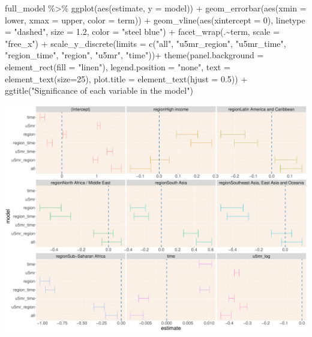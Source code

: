 \documentclass[
]{article}
\newenvironment{Shaded}{\begin{snugshade}}{\end{snugshade}}
\newcommand{\AttributeTok}[1]{\textcolor[rgb]{0.77,0.63,0.00}{#1}}
\newcommand{\DecValTok}[1]{\textcolor[rgb]{0.00,0.00,0.81}{#1}}
\newcommand{\FloatTok}[1]{\textcolor[rgb]{0.00,0.00,0.81}{#1}}
\newcommand{\FunctionTok}[1]{\textcolor[rgb]{0.00,0.00,0.00}{#1}}
\newcommand{\NormalTok}[1]{#1}
\newcommand{\SpecialCharTok}[1]{\textcolor[rgb]{0.00,0.00,0.00}{#1}}
\newcommand{\StringTok}[1]{\textcolor[rgb]{0.31,0.60,0.02}{#1}}
\begin{document}
\begin{Shaded}
\begin{Highlighting}[]
\NormalTok{full\_model }\SpecialCharTok{\%\textgreater{}\%} \FunctionTok{ggplot}\NormalTok{(}\FunctionTok{aes}\NormalTok{(estimate, }\AttributeTok{y =}\NormalTok{ model)) }\SpecialCharTok{+}
  \FunctionTok{geom\_errorbar}\NormalTok{(}\FunctionTok{aes}\NormalTok{(}\AttributeTok{xmin =}\NormalTok{ lower, }\AttributeTok{xmax =}\NormalTok{ upper, }\AttributeTok{color =}\NormalTok{ term)) }\SpecialCharTok{+}
  \FunctionTok{geom\_vline}\NormalTok{(}\FunctionTok{aes}\NormalTok{(}\AttributeTok{xintercept =} \DecValTok{0}\NormalTok{),}
             \AttributeTok{linetype =} \StringTok{"dashed"}\NormalTok{,}
             \AttributeTok{size =} \FloatTok{1.2}\NormalTok{,}
             \AttributeTok{color =} \StringTok{"steel blue"}\NormalTok{) }\SpecialCharTok{+}
  \FunctionTok{facet\_wrap}\NormalTok{(.}\SpecialCharTok{\textasciitilde{}}\NormalTok{term, }\AttributeTok{scale =} \StringTok{"free\_x"}\NormalTok{) }\SpecialCharTok{+}
  \FunctionTok{scale\_y\_discrete}\NormalTok{(}\AttributeTok{limits =} \FunctionTok{c}\NormalTok{(}\StringTok{"all"}\NormalTok{, }\StringTok{"u5mr\_region"}\NormalTok{, }\StringTok{"u5mr\_time"}\NormalTok{, }\StringTok{"region\_time"}\NormalTok{, }\StringTok{"region"}\NormalTok{, }\StringTok{"u5mr"}\NormalTok{, }\StringTok{"time"}\NormalTok{))}\SpecialCharTok{+} 
  \FunctionTok{theme}\NormalTok{(}\AttributeTok{panel.background =} \FunctionTok{element\_rect}\NormalTok{(}\AttributeTok{fill =} \StringTok{"linen"}\NormalTok{), }\AttributeTok{legend.position =} \StringTok{"none"}\NormalTok{, }\AttributeTok{text =} \FunctionTok{element\_text}\NormalTok{(}\AttributeTok{size=}\DecValTok{25}\NormalTok{), }\AttributeTok{plot.title =} \FunctionTok{element\_text}\NormalTok{(}\AttributeTok{hjust =} \FloatTok{0.5}\NormalTok{)) }\SpecialCharTok{+}
  \FunctionTok{ggtitle}\NormalTok{(}\StringTok{"Significance of each variable in the model"}\NormalTok{)}
\end{Highlighting}
\end{Shaded}

\includegraphics{A2_files/figure-latex/variable-choice-1.pdf}
\end{document}
